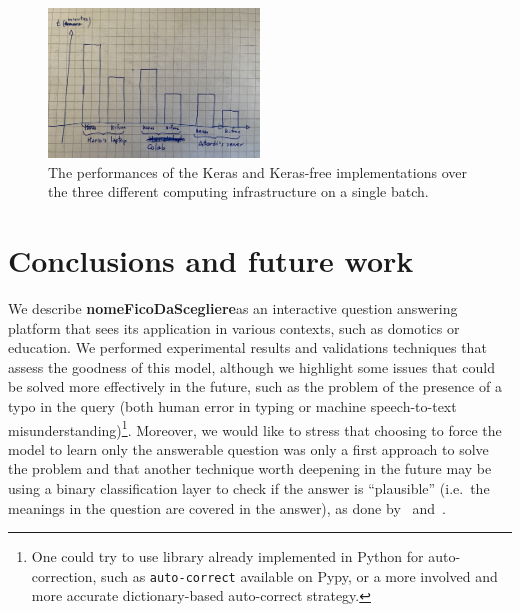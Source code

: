 \documentclass[10pt,hidelinks]{article}
\newcommand{\nomefico}{\textbf{nomeFicoDaScegliere}}
\begin{document}
\begin{figure}[ht!]
	\centering
	\includegraphics[width=0.5\textwidth]{pics/performances.JPG}
	\caption{The performances of the Keras and Keras-free implementations over the three different computing infrastructure on a single batch.}\label{fig:performances}
\end{figure}


\section{Conclusions and future work}\label{sec:conclusions_and_future_work}
We describe \nomefico as an interactive question answering platform that sees its application in various contexts, such as domotics or education.
We performed experimental results and validations techniques that assess the goodness of this model, although we highlight some issues that could be solved more effectively in the future, such as the problem of the presence of a typo in the query (both human error in typing or machine speech-to-text misunderstanding)\footnote{One could try to use library already implemented in Python for auto-correction, such as \texttt{auto-correct} available on Pypy, or a more involved and more accurate dictionary-based auto-correct strategy.}.
Moreover, we would like to stress that choosing to force the model to learn only the answerable question was only a first approach to solve the problem and that another technique worth deepening in the future may be using a binary classification layer to check if the answer is ``plausible'' (i.e.~the meanings in the question are covered in the answer), as done by~\cite{Hu2019ReadV} and~\cite{Back2020NeurQuRI}.

\end{document}
